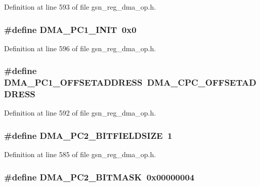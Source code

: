 Definition at line 593 of file gsn\_\-reg\_\-dma\_\-op.h.

\hypertarget{a00547_afc2289327605fe02ebfeb946919fe5b5}{
\subsubsection[{DMA\_\-PC1\_\-INIT}]{\setlength{\rightskip}{0pt plus 5cm}\#define DMA\_\-PC1\_\-INIT~0x0}}
\label{a00547_afc2289327605fe02ebfeb946919fe5b5}


Definition at line 596 of file gsn\_\-reg\_\-dma\_\-op.h.

\hypertarget{a00547_a5bcf743628bf5a288525da9914231160}{
\subsubsection[{DMA\_\-PC1\_\-OFFSETADDRESS}]{\setlength{\rightskip}{0pt plus 5cm}\#define DMA\_\-PC1\_\-OFFSETADDRESS~DMA\_\-CPC\_\-OFFSETADDRESS}}
\label{a00547_a5bcf743628bf5a288525da9914231160}


Definition at line 592 of file gsn\_\-reg\_\-dma\_\-op.h.

\hypertarget{a00547_ab207c60bc52ee0c47873be92b6683d45}{
\subsubsection[{DMA\_\-PC2\_\-BITFIELDSIZE}]{\setlength{\rightskip}{0pt plus 5cm}\#define DMA\_\-PC2\_\-BITFIELDSIZE~1}}
\label{a00547_ab207c60bc52ee0c47873be92b6683d45}


Definition at line 585 of file gsn\_\-reg\_\-dma\_\-op.h.

\hypertarget{a00547_a8bc6bf603200c5576041f5efb1bbb3fa}{
\subsubsection[{DMA\_\-PC2\_\-BITMASK}]{\setlength{\rightskip}{0pt plus 5cm}\#define DMA\_\-PC2\_\-BITMASK~0x00000004}}
\label{a00547_a8bc6bf603200c5576041f5efb1bbb3fa}


